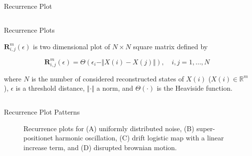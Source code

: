 {{{\begin{frame}{Recurrence Plot}
\end{frame}
}




\subsection{}
{

\begin{frame}{Recurrence Plots}

$\mathbf{R}^{m}_{i,j} (\epsilon)$ is two dimensional plot of $N \times N$ square matrix
defined by

\begin{equation*}
\mathbf{R}^{m}_{i,j} (\epsilon) = 
\Theta ( \epsilon_i - \Vert X(i) - X(j) \Vert ), 
\quad i,j=1,\dots,N
\end{equation*}

where $N$ is the number of considered reconstructed states of $X(i)$
($X(i) \in \mathbb{R}^m$), 
$\epsilon$ is a threshold distance, 
$ \Vert  \cdot \Vert$ a norm, 
and $\Theta( \cdot )$ is the Heaviside function.

\end{frame}
}








\subsection{}
{

\begin{frame}{Recurrence Plot Patterns}
    \begin{figure}
	\caption{Recurrence plots for (A) uniformly distributed noise,
		(B) super-positionet harmonic oscillation,
		(C) drift logistic map with a linear increase term, and
		(D) disrupted brownian motion.
		} 
   \end{figure}
	
\end{frame}
}


}}
